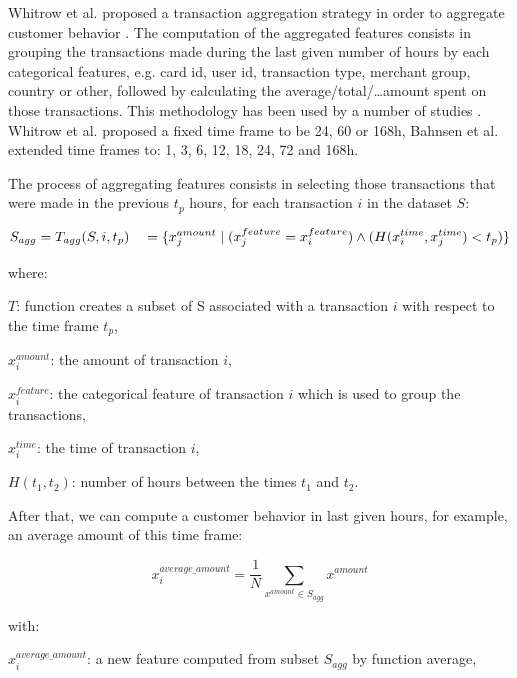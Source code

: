 Whitrow et al. proposed a transaction aggregation strategy in order to aggregate customer behavior \citep{whitrow2009transaction}. The computation of the aggregated features consists in grouping the transactions made during the last given number of hours by each categorical features, e.g. card id, user id, transaction type, merchant group, country or other, followed by calculating the average/total/\dots amount spent on those transactions. This methodology has been used by a number of studies \citep{bhattacharyya2011data, bahnsen2013cost, dal2014learned, jha2012employing, sahin2013cost, tasoulis2008mining, weston2008plastic}. Whitrow et al. \citep{weston2008plastic} proposed a fixed time frame to be 24, 60 or 168h, Bahnsen et al. \cite{bahnsen2016feature} extended time frames to: 1, 3, 6, 12, 18, 24, 72 and 168h.

The process of aggregating features consists in selecting those transactions that were made in the previous $t_p$ hours, for each transaction $i$ in the dataset $S$:


\begin{equation}
S_{agg} = T_{agg} (S, i, t_p) \\
\quad = \lbrace x_j^{amount} \mid ( x_j^{feature} = x_i^{feature} ) \wedge (H(x_i^{time}, x_j^{time}) < t_p) \rbrace
\end{equation}


where:

$T$: function creates a subset of S associated with a transaction $i$ with respect to the time frame $t_p$,

$x_i^{amount}$: the amount of transaction $i$,

$x_i^{feature}$: the categorical feature of transaction $i$ which is used to group the transactions,

$x_i^{time}$: the time of transaction $i$,

$H(t_1, t_2)$: number of hours between the times $t_1$ and $t_2$.

After that, we can compute a customer behavior in last given hours, for example, an average amount of this time frame:


\begin{equation}
x_i^{average\_amount} = \dfrac{1}{N} \sum_{x^{amount} \in S_{agg}} x^{amount}
\end{equation}


with:

$x_i^{average\_amount}$: a new feature computed from subset $S_{agg}$ by function average,

